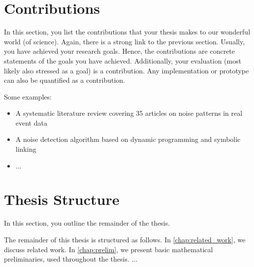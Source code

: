 \section{Contributions}
In this section, you list the contributions that your thesis makes to our wonderful world (of science).
Again, there is a strong link to the previous section.
Usually, you have achieved your research goals.
Hence, the contributions are concrete statements of the goals you have achieved.
Additionally, your evaluation (most likely also stressed as a goal) is a contribution.
Any implementation or prototype can also be quantified as a contribution.

Some examples:
\begin{itemize}
	\item A systematic literature review covering 35 articles on noise patterns in real event data
	\item A noise detection algorithm based on dynamic programming and symbolic linking
	\item ...
\end{itemize}

\section{Thesis Structure}
In this section, you outline the remainder of the thesis.

The remainder of this thesis is structured as follows.
In \autoref{chap:related_work}, we discuss related work.
In \autoref{chap:prelim}, we present basic mathematical preliminaries, used throughout the thesis.
...